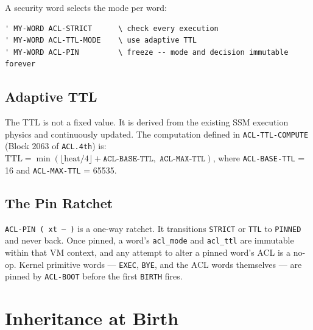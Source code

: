 A security word selects the mode per word:

\begin{lstlisting}[language=Forth]
' MY-WORD ACL-STRICT      \ check every execution
' MY-WORD ACL-TTL-MODE    \ use adaptive TTL
' MY-WORD ACL-PIN         \ freeze -- mode and decision immutable forever
\end{lstlisting}

\subsection{Adaptive TTL}


The TTL is not a fixed value. It is derived from the existing SSM execution
physics and continuously updated. The computation defined in
\texttt{ACL-TTL-COMPUTE} (Block 2063 of \texttt{ACL.4th}) is:
$\text{TTL} = \min(\lfloor \text{heat} / 4 \rfloor + \texttt{ACL-BASE-TTL},\;
\texttt{ACL-MAX-TTL})$, where \texttt{ACL-BASE-TTL} = 16 and
\texttt{ACL-MAX-TTL} = 65535.

\subsection{The Pin Ratchet}


\texttt{ACL-PIN ( xt -- )} is a one-way ratchet. It transitions
\texttt{STRICT} or \texttt{TTL} to \texttt{PINNED} and never back. Once
pinned, a word's \texttt{acl\_mode} and \texttt{acl\_ttl} are immutable
within that VM context, and any attempt to alter a pinned word's ACL is a
no-op. Kernel primitive words --- \texttt{EXEC}, \texttt{BYE}, and the ACL
words themselves --- are pinned by \texttt{ACL-BOOT} before the first
\texttt{BIRTH} fires.

\section{Inheritance at Birth}
\label{vol2:sec:acl:inherit}


